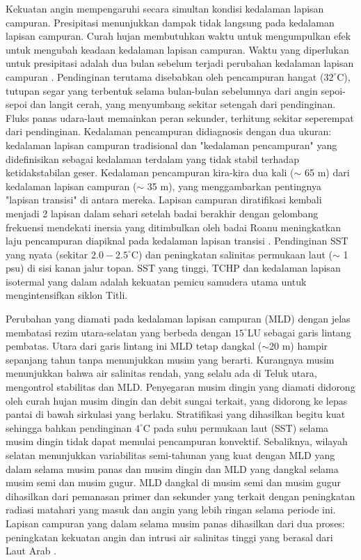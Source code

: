 \begin{spacing}{1.5}
	Kekuatan angin mempengaruhi secara simultan kondisi kedalaman lapisan campuran. Presipitasi menunjukkan dampak tidak langsung pada kedalaman lapisan campuran. Curah hujan membutuhkan waktu untuk mengumpulkan efek untuk mengubah keadaan kedalaman lapisan campuran. Waktu yang diperlukan untuk presipitasi adalah dua bulan sebelum terjadi perubahan kedalaman lapisan campuran  . Pendinginan terutama disebabkan oleh pencampuran hangat ($32^\circ$C), tutupan segar yang terbentuk selama bulan-bulan sebelumnya dari angin sepoi-sepoi dan langit cerah, yang menyumbang sekitar setengah dari pendinginan. Fluks panas udara-laut memainkan peran sekunder, terhitung sekitar seperempat dari pendinginan. Kedalaman pencampuran didiagnosis dengan dua ukuran: kedalaman lapisan campuran tradisional dan "kedalaman pencampuran" yang didefinisikan sebagai kedalaman terdalam yang tidak stabil terhadap ketidakstabilan geser. Kedalaman pencampuran kira-kira dua kali ($\sim$ 65 m) dari kedalaman lapisan campuran ($\sim$ 35 m), yang menggambarkan pentingnya "lapisan transisi" di antara mereka. Lapisan campuran diratifikasi kembali menjadi 2 lapisan dalam sehari setelah badai berakhir dengan gelombang frekuensi mendekati inersia yang ditimbulkan oleh badai Roanu meningkatkan laju pencampuran diapiknal pada kedalaman lapisan transisi . Pendinginan SST yang nyata (sekitar $2.0 - 2.5^\circ$C) dan peningkatan salinitas permukaan laut ($\sim$ 1 psu) di sisi kanan jalur topan. SST yang tinggi, TCHP dan kedalaman lapisan isotermal yang dalam adalah kekuatan pemicu samudera utama untuk mengintensifkan siklon Titli.
	
	Perubahan yang diamati pada kedalaman lapisan campuran (MLD) dengan jelas membatasi rezim utara-selatan yang berbeda dengan $15^\circ$LU sebagai garis lintang pembatas. Utara dari garis lintang ini MLD tetap dangkal ($\sim$20 m) hampir sepanjang tahun tanpa menunjukkan musim yang berarti. Kurangnya musim menunjukkan bahwa air salinitas rendah, yang selalu ada di Teluk utara, mengontrol stabilitas dan MLD. Penyegaran musim dingin yang diamati didorong oleh curah hujan musim dingin dan debit sungai terkait, yang didorong ke lepas pantai di bawah sirkulasi yang berlaku. Stratifikasi yang dihasilkan begitu kuat sehingga bahkan pendinginan $4^\circ$C pada suhu permukaan laut (SST) selama musim dingin tidak dapat memulai pencampuran konvektif. Sebaliknya, wilayah selatan menunjukkan variabilitas semi-tahunan yang kuat dengan MLD yang dalam selama musim panas dan musim dingin dan MLD yang dangkal selama musim semi dan musim gugur. MLD dangkal di musim semi dan musim gugur dihasilkan dari pemanasan primer dan sekunder yang terkait dengan peningkatan radiasi matahari yang masuk dan angin yang lebih ringan selama periode ini. Lapisan campuran yang dalam selama musim panas dihasilkan dari dua proses: peningkatan kekuatan angin dan intrusi air salinitas tinggi yang berasal dari Laut Arab . 
	

\end{spacing}
